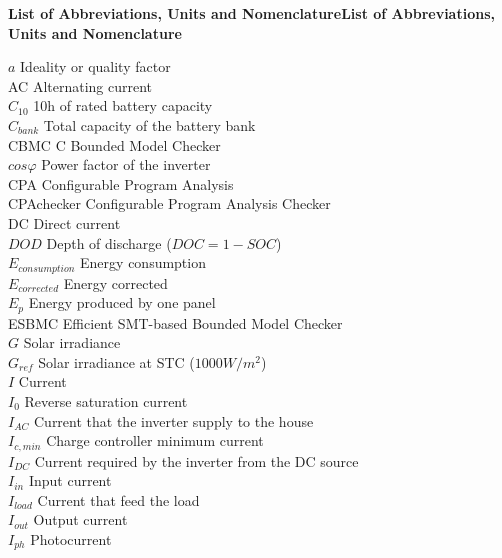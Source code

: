 \thispagestyle{plain}
\begin{center}
%    
%    
%    
    \vspace{0.9cm}
    \textbf{List of Abbreviations, Units and NomenclatureList of Abbreviations, Units and Nomenclature}
\end{center}

\noindent $a$ Ideality or quality factor \\
AC Alternating current \\
$C_{10}$ 10h of rated battery capacity \\
$C_{bank}$ Total capacity of the battery bank \\
CBMC C Bounded Model Checker \\
$ cos \varphi $ Power factor of the inverter \\
CPA Configurable Program Analysis \\
CPAchecker Configurable Program Analysis Checker \\
DC Direct current \\
$DOD$ Depth of discharge ($DOC=1-SOC$) \\
$E_{consumption}$ Energy consumption \\
$E_{corrected}$ Energy corrected \\
$E_{p}$ Energy produced by one panel \\
ESBMC Efficient SMT-based Bounded Model Checker \\
$G$ Solar irradiance \\
$ G_{ref} $ Solar irradiance at STC ($1000 W/m^{2}$) \\
$I$ Current \\
$I_{0}$ Reverse saturation current \\
$ I_{AC} $ Current that the inverter supply to the house \\
$I_{c,min}$ Charge controller minimum current \\
$ I_{DC} $ Current required by the inverter from the DC source \\
$ I_{in} $ Input current \\
$I_{load}$ Current that feed the load \\
$ I_{out} $ Output current \\
$I_{ph}$ Photocurrent \\
